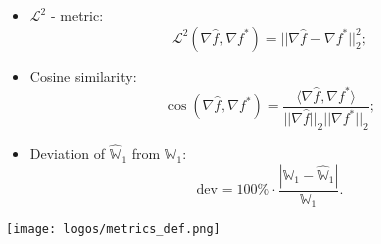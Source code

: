 \documentclass[final]{beamer}
\newlength{\colwidth}
\begin{document}
\begin{frame}[t]
\begin{columns}[t]
\begin{column}{\colwidth}
\begin{block}{\noindent{}}
    
\noindent\begin{minipage}{0.6\textwidth}%
  \begin{itemize}
      \item $\mathcal{L}^2$ - metric:
      $$\mathcal{L}^{2}(\nabla \hat{f},\nabla f^{*}) = ||\nabla{\hat{f}} - \nabla{f^{*}}||_{2}^{2}; $$
      \item Cosine similarity:
      $$ \cos(\nabla \hat{f},\nabla f^{*}) = \frac{\langle \nabla \hat{f},\nabla f^{*} \rangle}{||\nabla \hat{f}||_{2} ||\nabla f^{*}||_{2}};$$
      \item  Deviation of $ {\mathbb{\hat{W}}_{1}}$ from $\mathbb{W}_{1}$:\vspace{1 mm}
      $$\text{dev} = 100\%\cdot \frac{|\mathbb{W}_{1}-\widehat{\mathbb{W}}_{1}|}{\mathbb{W}_{1}} .$$
  \end{itemize}
\end{minipage}%
\hfill%
\begin{minipage}
{0.4\textwidth}\RaggedRight
\texttt{[image: logos/metrics\_def.png]}
\end{minipage}
\end{block}

\begin{block}{\noindent{}}


\end{block}
\end{column}
\end{columns}
\end{frame}
\end{document}
